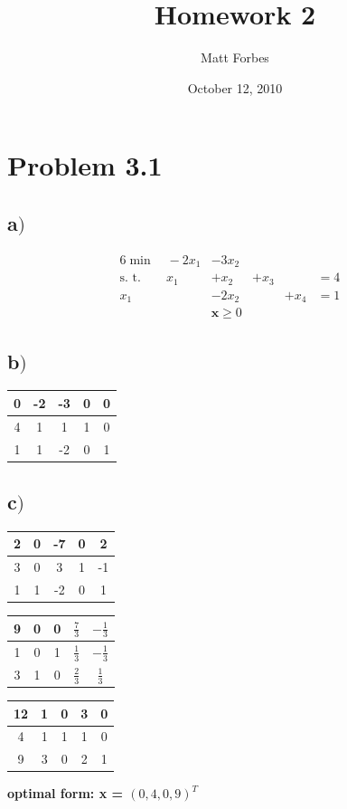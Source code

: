 \documentclass[a4paper,12pt]{article}
\begin{document}
\title{Homework 2}
\author{Matt Forbes}
\date{October 12, 2010}
\maketitle
\section*{Problem 3.1}
\subsection*{a\()\)}
\begin{alignat*}{6}
  \min \quad -2x_1& - 3x_2& {}& {}& {}& \\
  \text{s. t.} \quad \quad x_1& + x_2& + x_3& {}& = 4 \\
  x_1& - 2x_2& {}& + x_4& = 1 \\
  {}& \mathbf{x} \ge 0
\end{alignat*}
\subsection*{b\()\)}
\begin{center}
  \begin{tabular}{| c | c c c c |}
    \hline
    0 & -2 & -3 & 0 & 0 \\
    \hline
    4 & 1 & 1 & 1 & 0 \\
    1 & 1 & -2 & 0 & 1 \\
    \hline
  \end{tabular}
\end{center}
\subsection*{c\()\)}
\begin{center}
  \begin{tabular}{| c | c c c c |}
    \hline
    2 & 0 & -7 & 0 & 2 \\
    \hline
    3 & 0 & 3 & 1 & -1 \\
    1 & 1 & -2 & 0 & 1 \\
    \hline
  \end{tabular}
\end{center}
\begin{center}
  \begin{tabular}{| c | c c c c |}
    \hline
    9 & 0 & 0 & \(\frac{7}{3}\) & \(-\frac{1}{3}\) \\
    \hline
    1 & 0 & 1 & \(\frac{1}{3}\) & \(-\frac{1}{3}\) \\
    3 & 1 & 0 & \(\frac{2}{3}\) & \(\frac{1}{3}\) \\
    \hline
  \end{tabular}
\end{center}
\begin{center}
  \begin{tabular}{| c | c c c c |}
    \hline
    12 & 1 & 0 & 3 & 0 \\
    \hline
    4 & 1 & 1 & 1 & 0 \\
    9 & 3 & 0 & 2 & 1 \\
    \hline
  \end{tabular}
\end{center}
{\bf optimal form: x = \((0, 4, 0, 9)^T\)}
\end{document}
